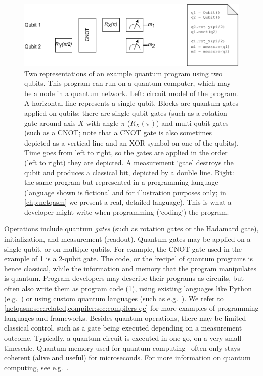 \begin{figure}[t]
    \centering
    \includegraphics[width=0.8\linewidth]{figures/background/local_circuit.pdf}
    \caption{
        Two representations of an example quantum program using two qubits.
        This program can run on a quantum computer, which may be a node in a quantum network.
        Left: circuit model of the program.
        A horizontal line represents a single qubit.
        Blocks are quantum gates applied on qubits; there are single-qubit gates (such as a rotation gate around axis $X$ with angle $\pi$ ($R_X(\pi)$) and multi-qubit gates (such as a CNOT; note that a CNOT gate is also sometimes depicted as a vertical line and an XOR symbol on one of the qubits).
        Time goes from left to right, so the gates are applied in the order (left to right) they are depicted.
        A measurement `gate' destroys the qubit and produces a classical bit, depicted by a double line.
        Right: the same program but represented in a programming language (language shown is fictional and for illustration purposes only; in \cref{chp:netqasm} we present a real, detailed language).
        This is what a developer might write when programming (`coding') the program.
    }
    \label{background:fig:local_circuit}
\end{figure}

Operations include quantum \emph{gates} (such as rotation gates or the Hadamard gate), initialization, and measurement (readout).
Quantum gates may be applied on a single qubit, or on multiple qubits.
For example, the CNOT gate used in the example of \cref{background:fig:local_circuit} is a 2-qubit gate.
The code, or the `recipe' of quantum programs is hence classical, while the information and memory that the program manipulates is quantum.
Program developers may describe their programs as circuits, but often also write them as program code (\cref{background:fig:local_circuit}), using existing languages like Python (e.g.~\cite{steiger_projectq_2018}) or using custom quantum languages (such as e.g.~\cite{svore_q_2018}).
We refer to \cref{netqasm:sec:related,compiler:sec:compilers-qc} for more examples of programming languages and frameworks.
Besides quantum operations, there may be limited classical control, such as a gate being executed depending on a measurement outcome.
Typically, a quantum circuit is executed in one go, on a very small timescale.
Quantum memory used for quantum computing~\cite{de_leon_materials_2021} often only stays coherent (alive and useful) for microseconds.
For more information on quantum computing, see e.g.~\cite{nielsen_chuang_2002}.

